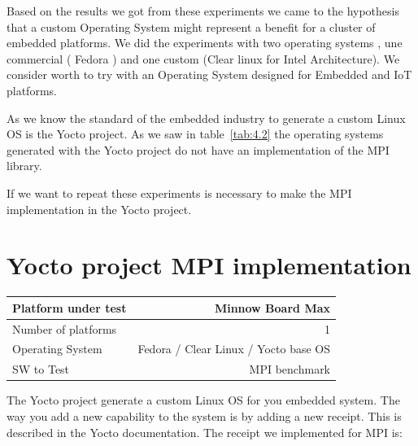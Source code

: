 Based on the results we got from these experiments we came to the hypothesis
that a custom Operating System might represent a benefit for a cluster of
embedded platforms. We did the experiments with two operating systems , une
commercial ( Fedora ) and one custom (Clear linux for Intel Architecture). We
consider worth to try with an Operating System designed for Embedded and IoT
platforms. 

As we know the standard of the embedded industry to generate a custom Linux OS
is the Yocto project. As we saw in table~\ref{tab:4.2} the operating systems
generated with the Yocto project do not have an implementation of the MPI
library. 

If we want to repeat these experiments is necessary to make the MPI
implementation in the Yocto project. 


\section{Yocto project MPI implementation}

    \begin{center}
    \begin{tabular}{ | l | r |}
        \hline
        Platform under test & Minnow Board  Max \\ \hline
        Number of platforms  & 1  \\ \hline
        Operating System & Fedora / Clear Linux / Yocto base OS  \\ \hline
        SW to Test & MPI benchmark \\ \hline
    \end{tabular}
     \label{Sanity Sumary}
    \end{center}

The Yocto project \cite{yocto-project} generate a custom Linux OS for you
embedded system. The way you add a new capability to the system is by adding a
new receipt. This is described in the Yocto documentation. The receipt we
implemented for MPI is: 

